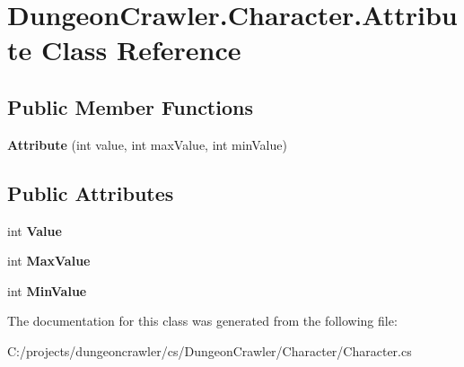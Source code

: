 \hypertarget{class_dungeon_crawler_1_1_character_1_1_attribute}{}\section{Dungeon\+Crawler.\+Character.\+Attribute Class Reference}
\label{class_dungeon_crawler_1_1_character_1_1_attribute}
\subsection*{Public Member Functions}
\begin{DoxyCompactItemize}
\item 
\hypertarget{class_dungeon_crawler_1_1_character_1_1_attribute_ab72a00669748ae0d34854e204f6c2bc3}{}{\bfseries Attribute} (int value, int max\+Value, int min\+Value)\label{class_dungeon_crawler_1_1_character_1_1_attribute_ab72a00669748ae0d34854e204f6c2bc3}

\end{DoxyCompactItemize}
\subsection*{Public Attributes}
\begin{DoxyCompactItemize}
\item 
\hypertarget{class_dungeon_crawler_1_1_character_1_1_attribute_a6b90a26a21371fb4ef9be0f59e0969d4}{}int {\bfseries Value}\label{class_dungeon_crawler_1_1_character_1_1_attribute_a6b90a26a21371fb4ef9be0f59e0969d4}

\item 
\hypertarget{class_dungeon_crawler_1_1_character_1_1_attribute_ada64988d817204be249a826ef2397505}{}int {\bfseries Max\+Value}\label{class_dungeon_crawler_1_1_character_1_1_attribute_ada64988d817204be249a826ef2397505}

\item 
\hypertarget{class_dungeon_crawler_1_1_character_1_1_attribute_ad3948aff878c3e156284f58af0fb0783}{}int {\bfseries Min\+Value}\label{class_dungeon_crawler_1_1_character_1_1_attribute_ad3948aff878c3e156284f58af0fb0783}

\end{DoxyCompactItemize}


The documentation for this class was generated from the following file\+:\begin{DoxyCompactItemize}
\item 
C\+:/projects/dungeoncrawler/cs/\+Dungeon\+Crawler/\+Character/Character.\+cs\end{DoxyCompactItemize}

